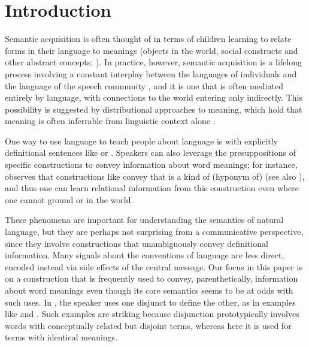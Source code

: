 \section{Introduction}\label{sec:intro}

Semantic acquisition is often thought of in terms of children learning
to relate forms in their language to meanings (objects in the world,
social constructs and other abstract concepts;
\cite{Frank:Goodman:Tenenbaum:2009}). In practice, however, semantic
acquisition is a lifelong process involving a constant interplay
between the languages of individuals and the language of the speech
community \cite{Lewis75LL}, and it is one that is often mediated
entirely by language, with connections to the world entering only
indirectly. This possibility is suggested by distributional approaches
to meaning, which hold that meaning is often inferrable from
linguistic context alone \cite{Harris54,TurneyPantel10}.

One way to use language to teach people about language is with
explicitly definitional sentences like  or . Speakers can also leverage the presuppositions of
specific constructions to convey information about word meanings; for
instance, \cite{Hearst92} observes that constructions like  convey that  is a kind of (hyponym of) 
(see also \cite{SnowEtAl05}), and thus one can learn relational
information from this construction even where one cannot ground
 or  in the world.

These phenomena are important for understanding the semantics of
natural language, but they are perhaps not surprising from a
communicative perspective, since they involve constructions that
unambiguously convey definitional information.  Many signals about the
conventions of language are less direct, encoded instead via side
effects of the central message.  Our focus in this paper is on a
construction that is frequently used to convey, parenthetically,
information about word meanings even though its core semantics seems
to be at odds with such uses.  In ,
the speaker uses one disjunct to define the other, as in examples like
 and . Such examples are striking because disjunction
prototypically involves words with conceptually related but disjoint
terms, whereas here it is used for terms with identical meanings.

